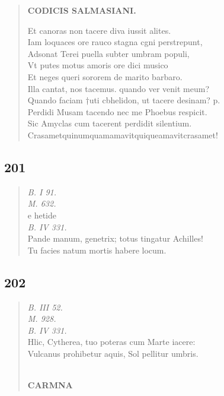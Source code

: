 \documentclass[11pt, a4paper]{report}
\begin{document}
\begin{verse}
    \begin{center} \textbf{CODICIS SALMASIANI.} \end{center} \marginpar{[175]} Et canoras non tacere diva iussit alites. \\ Iam loquaces ore rauco stagna cgni perstrepunt, \\ Adsonat Terei puella subter umbram populi, \\ Vt putes motus amoris ore dici musico \\ Et neges queri sororem de marito barbaro. \\ Illa cantat, nos tacemus. quando ver venit meum? \\ Quando faciam †uti cbhelidon, ut tacere desinam? p. \\ Perdidi Musam tacendo nec me Phoebus respicit. \\ Sic Amyclas cum tacerent perdidit silentium. \\ Crasametquinumquamamavitquiqueamavitcrasamet! \\ 
      \end{verse}
  
            \subsection*{201}
      \begin{verse}
      \textit{B. I 91.} \\ \textit{M. 632.} \\ e hetide \\ \textit{B. IV 331.} \\ Pande manum, genetrix; totus tingatur Achilles! \\ Tu facies natum mortis habere locum. \\ 
      \end{verse}
  
            \subsection*{202}
      \begin{verse}
      \textit{B. III 52.} \\ \textit{M. 928.} \\ \textit{B. IV 331.} \\ Hlic, Cytherea, tuo poteras cum Marte iacere: \\ Vulcanus prohibetur aquis, Sol pellitur umbris. \\ 
        ﻿\pagebreak 
     \marginpar{[176]} \begin{center} \textbf{CARMNA} \end{center}
      \end{verse}
  
\end{document}
